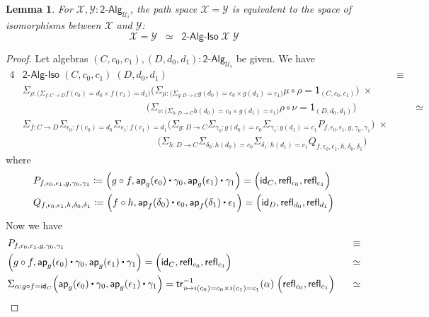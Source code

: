 \documentclass[11pt]{article}
\newcommand{\X}{\mathcal{X}}
\newcommand{\Y}{\mathcal{Y}}
\newcommand{\comp}{\circ}
\newcommand{\idfun}[1]{\mathsf{id}_{#1}}
\newcommand{\sm}[1]{\Sigma_{#1}}
\newcommand{\defeq}{\coloneqq}
\newcommand{\refl}{\mathsf{refl}}
\newcommand{\one}{\mathsf{1}}
\newcommand{\UU}{\mathcal{U}}
\newcommand{\BoolAlg}{\mathsf{2}\text{-}\mathsf{Alg}}
\newcommand{\app}{\mathsf{ap}}
\newcommand{\trans}{\mathsf{tr}}
\newcommand{\BoolAlgIso}{\mathsf{2}\text{-}\mathsf{Alg}\text{-}\mathsf{Iso}}
\newcommand{\ct}{%
  \mathchoice{\mathbin{\raisebox{0.5ex}{$\displaystyle\centerdot$}}}%
             {\mathbin{\raisebox{0.5ex}{$\centerdot$}}}%
             {\mathbin{\raisebox{0.25ex}{$\scriptstyle\,\centerdot\,$}}}%
             {\mathbin{\raisebox{0.1ex}{$\scriptscriptstyle\,\centerdot\,$}}}}
\newtheorem{lemma}[theorem]{Lemma}
\theoremstyle{definition}
\begin{document}
\begin{lemma}\label{BoolAlgSpace}
For $\X,\Y : \BoolAlg_{\UU_i}$, the path space $\X = \Y$ is equivalent to the space of isomorphisms between $\X$ and $\Y$:
\[ \X = \Y \;\; \simeq \;\; \BoolAlgIso \; \X \; \Y \] 
\end{lemma}
\begin{proof}
Let algebras $(C,c_0,c_1), (D,d_0,d_1) : \BoolAlg_{\UU_i}$ be given. We have
\begin{alignat*}{4}
& \BoolAlgIso \; (C,c_0,c_1) \; (D,d_0,d_1) & \equiv \\
& \sm{\rho : \big(\sm{f:C\to D} f(c_0) =d_0 \times f(c_1) = d_1\big)} \Big(\sm{\mu : \big(\sm{g:D\to C} g(d_0)=c_0 \times g(d_1)=c_1\big)} \mu \comp \rho = \one_{(C,c_0,c_1)} \Big)\; \times & \\
& \;\;\;\;\;\;\;\;\;\;\;\;\;\;\;\;\;\;\;\;\;\;\;\;\;\;\;\;\;\;\;\;\;\;\;\;\;\;\;\;\;\;\;\;\;\Big(\sm{\nu : \big(\sm{h:D\to C} h(d_0)=c_0 \times g(d_1)=c_1\big)} \rho \comp \nu = \one_{(D,d_0,d_1)}\Big) & \;\;\;\;\;\;\; \simeq \\
& \sm{f : C\to D} \sm{\epsilon_0 : f(c_0)=d_0} \sm{\epsilon_1 : f(c_1) = d_1} \Big(\sm{g:D\to C} \sm{\gamma_0 : g(d_0)=c_0} \sm{\gamma_1 : g(d_1) = c_1} P_{f,\epsilon_0,\epsilon_1,g,\gamma_0,\gamma_1}\Big) \; \times & \\
& \;\;\;\;\;\;\;\;\;\;\;\;\;\;\;\;\;\;\;\;\;\;\;\;\;\;\;\;\;\;\;\;\;\;\;\;\;\;\;\;\;\;\;\;\;\;\;\;\; \Big(\sm{h:D\to C} \sm{\delta_0 : h(d_0)=c_0} \sm{\delta_1 : h(d_1) = c_1} Q_{f,\epsilon_0,\epsilon_1,h,\delta_0,\delta_1} \Big) &
\end{alignat*}
where
\begin{align*}
& P_{f,\epsilon_0,\epsilon_1,g,\gamma_0,\gamma_1} \defeq \Big(g \comp f, \app_g(\epsilon_0) \ct \gamma_0, \app_g(\epsilon_1) \ct \gamma_1\Big) = \Big(\idfun{C}, \refl_{c_0}, \refl_{c_1}\Big) \\
& Q_{f,\epsilon_0,\epsilon_1,h,\delta_0,\delta_1} \defeq \Big(f \comp h, \app_f(\delta_0) \ct \epsilon_0, \app_f(\delta_1) \ct \epsilon_1\Big) = \Big(\idfun{D}, \refl_{d_0}, \refl_{d_1}\Big)
\end{align*}
Now we have
\begin{alignat*}{4}
& P_{f,\epsilon_0,\epsilon_1,g,\gamma_0,\gamma_1} & \equiv \\
& \Big(g \comp f, \app_g(\epsilon_0) \ct \gamma_0, \app_g(\epsilon_1) \ct \gamma_1\Big) = \Big(\idfun{C}, \refl_{c_0}, \refl_{c_1}\Big) & \simeq \\
& \sm{\alpha : g \comp f = \idfun{C}} \Big(\app_g(\epsilon_0) \ct \gamma_0, \app_g(\epsilon_1) \ct \gamma_1\Big) = \trans^{-1}_{i \mapsto i(c_0) = c_0 \times i(c_1) = c_1}(\alpha) \; \Big(\refl_{c_0}, \refl_{c_1}\Big) & \;\;\; \simeq \\

\end{alignat*}
\end{proof}
\end{document}
